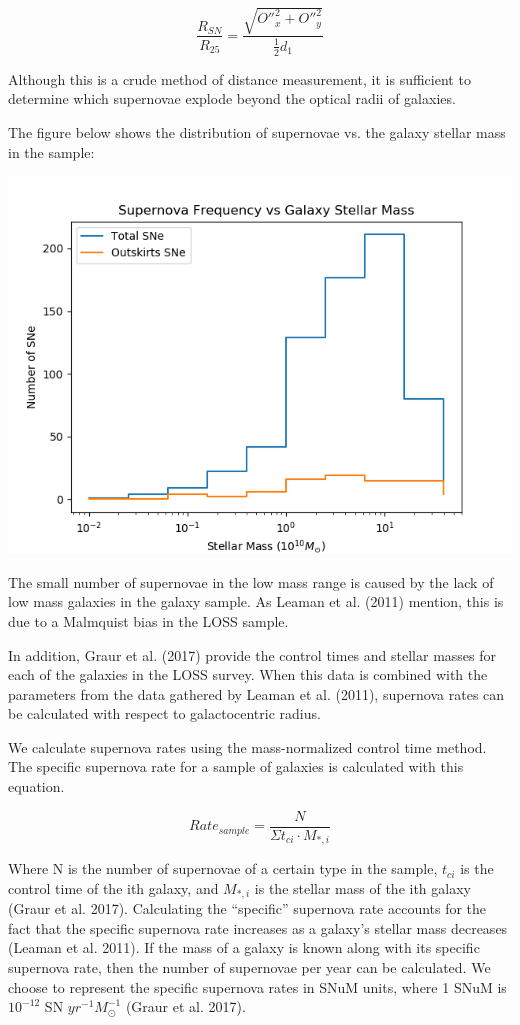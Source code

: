 \documentclass[apj]{emulateapj}
\begin{document}
\begin{equation}
\frac{R_{SN}}{R_{25}}=\frac{\sqrt{{O''}_x^2 + {O''}_y^2}}{\frac{1}{2} d_1}
\end{equation}

Although this is a crude method of distance measurement, it is sufficient to determine which supernovae explode beyond the optical radii of galaxies.

The figure below shows the distribution of supernovae vs. the galaxy stellar mass in the sample:

\includegraphics[scale=0.5]{supernova_freq_vs_stellar_mass}

The small number of supernovae in the low mass range is caused by the lack of low mass galaxies in the galaxy sample. As Leaman et al. (2011) mention, this is due to a Malmquist bias in the LOSS sample.

In addition, Graur et al. (2017) provide the control times and stellar masses for each of the galaxies in the LOSS survey. When this data is combined with the parameters from the data gathered by Leaman et al. (2011), supernova rates can be calculated with respect to galactocentric radius.

We calculate supernova rates using the mass-normalized control time method. The specific supernova rate for a sample of galaxies is calculated with this equation.

\begin{equation}
Rate_{sample}=\frac{N}{\Sigma t_{ci} \cdot M_{*, i}}
\end{equation}

Where N is the number of supernovae of a certain type in the sample, $t_{ci}$ is the control time of the ith galaxy, and $M_{*,i}$ is the stellar mass of the ith galaxy (Graur et al. 2017). Calculating the “specific” supernova rate accounts for the fact that the specific supernova rate increases as a galaxy's stellar mass decreases (Leaman et al. 2011). If the mass of a galaxy is known along with its specific supernova rate, then the number of supernovae per year can be calculated. We choose to represent the specific supernova rates in SNuM units, where 1 SNuM is $10^{-12}$ SN $yr^{-1} M_{\odot}^{-1}$ (Graur et al. 2017).
\end{document}
